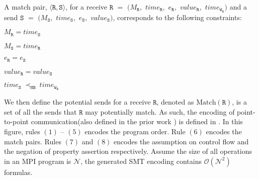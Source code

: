 \begin{definition} \label{def:match}
A match pair, $\langle\mathtt{R}, \mathtt{S}\rangle$, for a receive 
$\mathtt{R}$ $=$ $(M_\mathtt{R},$ $\mathit{time}_\mathtt{R},$ $e_\mathtt{R},$ $\mathit{value}_\mathtt{R},$ $\mathit{time}_{\mathtt{W}_\mathtt{R}})$ and a send $\mathtt{S}$ $=$ $(M_\mathtt{S},$ $\mathit{time}_\mathtt{S},$ $e_\mathtt{S},$ $\mathit{value}_\mathtt{S})$, corresponds to the following constraints:
\begin{compactenum}
\item $M_{\mathtt{R}} = \mathit{time}_{\mathtt{S}}$
\item $M_{\mathtt{S}} = \mathit{time}_{\mathtt{R}}$
\item $e_{\mathtt{R}} = e_{\mathtt{S}}$
\item $\mathit{value}_{\mathtt{R}} = \mathit{value}_{\mathtt{S}}$ 
\item $\mathit{time}_{\mathtt{S}}\ \mathrm{\prec_\mathtt{HB}}\ \mathit{time}_{\mathtt{W}_\mathtt{R}}$
\end{compactenum}
\end{definition}

We then define the potential sends for a receive $\mathtt{R}$, denoted as $\mathrm{Match}(\mathtt{R})$, is a set of all the sends that $\mathtt{R}$ may potentially match. As such, the encoding of point-to-point communication(also defined in the prior work \cite{DBLP:conf/kbse/HuangMM13}) is defined in . In this figure, rules $(1)$ -- $(5)$ encodes the program order. Rule $(6)$ encodes the match pairs. Rules $(7)$ and $(8)$ encodes the assumption on control flow and the negation of property assertion respectively. Assume the size of all operations in an MPI program is $\mathcal{N}$, the generated SMT encoding contains $\mathcal{O}(\mathcal{N}^2)$ formulas.

\encodingptp

